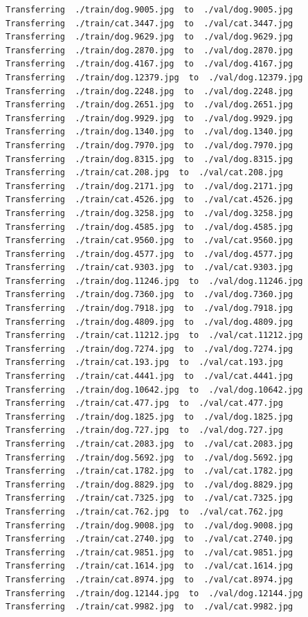 \documentclass[]{book}
\theoremstyle{definition}
\theoremstyle{definition}
\theoremstyle{definition}
\theoremstyle{remark}
\begin{document}
\begin{verbatim}
Transferring  ./train/dog.9005.jpg  to  ./val/dog.9005.jpg
Transferring  ./train/cat.3447.jpg  to  ./val/cat.3447.jpg
Transferring  ./train/dog.9629.jpg  to  ./val/dog.9629.jpg
Transferring  ./train/dog.2870.jpg  to  ./val/dog.2870.jpg
Transferring  ./train/dog.4167.jpg  to  ./val/dog.4167.jpg
Transferring  ./train/dog.12379.jpg  to  ./val/dog.12379.jpg
Transferring  ./train/dog.2248.jpg  to  ./val/dog.2248.jpg
Transferring  ./train/dog.2651.jpg  to  ./val/dog.2651.jpg
Transferring  ./train/dog.9929.jpg  to  ./val/dog.9929.jpg
Transferring  ./train/dog.1340.jpg  to  ./val/dog.1340.jpg
Transferring  ./train/dog.7970.jpg  to  ./val/dog.7970.jpg
Transferring  ./train/dog.8315.jpg  to  ./val/dog.8315.jpg
Transferring  ./train/cat.208.jpg  to  ./val/cat.208.jpg
Transferring  ./train/dog.2171.jpg  to  ./val/dog.2171.jpg
Transferring  ./train/cat.4526.jpg  to  ./val/cat.4526.jpg
Transferring  ./train/dog.3258.jpg  to  ./val/dog.3258.jpg
Transferring  ./train/dog.4585.jpg  to  ./val/dog.4585.jpg
Transferring  ./train/cat.9560.jpg  to  ./val/cat.9560.jpg
Transferring  ./train/dog.4577.jpg  to  ./val/dog.4577.jpg
Transferring  ./train/cat.9303.jpg  to  ./val/cat.9303.jpg
Transferring  ./train/dog.11246.jpg  to  ./val/dog.11246.jpg
Transferring  ./train/dog.7360.jpg  to  ./val/dog.7360.jpg
Transferring  ./train/dog.7918.jpg  to  ./val/dog.7918.jpg
Transferring  ./train/dog.4809.jpg  to  ./val/dog.4809.jpg
Transferring  ./train/cat.11212.jpg  to  ./val/cat.11212.jpg
Transferring  ./train/dog.7274.jpg  to  ./val/dog.7274.jpg
Transferring  ./train/cat.193.jpg  to  ./val/cat.193.jpg
Transferring  ./train/cat.4441.jpg  to  ./val/cat.4441.jpg
Transferring  ./train/dog.10642.jpg  to  ./val/dog.10642.jpg
Transferring  ./train/cat.477.jpg  to  ./val/cat.477.jpg
Transferring  ./train/dog.1825.jpg  to  ./val/dog.1825.jpg
Transferring  ./train/dog.727.jpg  to  ./val/dog.727.jpg
Transferring  ./train/cat.2083.jpg  to  ./val/cat.2083.jpg
Transferring  ./train/dog.5692.jpg  to  ./val/dog.5692.jpg
Transferring  ./train/cat.1782.jpg  to  ./val/cat.1782.jpg
Transferring  ./train/dog.8829.jpg  to  ./val/dog.8829.jpg
Transferring  ./train/cat.7325.jpg  to  ./val/cat.7325.jpg
Transferring  ./train/cat.762.jpg  to  ./val/cat.762.jpg
Transferring  ./train/dog.9008.jpg  to  ./val/dog.9008.jpg
Transferring  ./train/cat.2740.jpg  to  ./val/cat.2740.jpg
Transferring  ./train/cat.9851.jpg  to  ./val/cat.9851.jpg
Transferring  ./train/cat.1614.jpg  to  ./val/cat.1614.jpg
Transferring  ./train/cat.8974.jpg  to  ./val/cat.8974.jpg
Transferring  ./train/dog.12144.jpg  to  ./val/dog.12144.jpg
Transferring  ./train/cat.9982.jpg  to  ./val/cat.9982.jpg

\end{verbatim}
\end{document}
